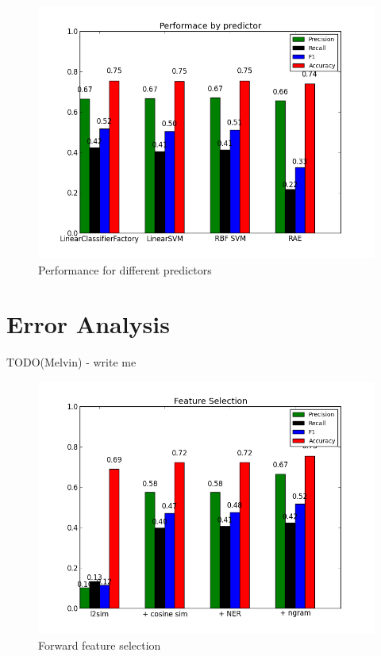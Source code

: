 \documentclass[conference]{IEEEtran}
\begin{document}
\begin{figure}
	\centering
	\includegraphics[scale=0.4]{cmp_predictors.png}
	\caption{Performance for different predictors}
	\label{predSelect}
\end{figure}

\section{Error Analysis}
TODO(Melvin) - write me


\begin{figure}
	\centering
	\includegraphics[scale=0.4]{ft_select.png}
	\caption{Forward feature selection}
	\label{feat}
\end{figure}
\end{document}
